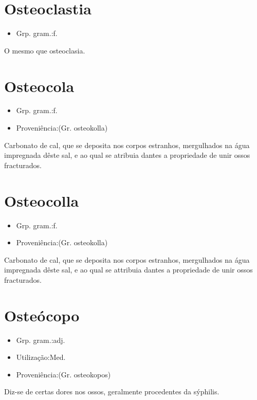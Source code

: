 \section{Osteoclastia}
\begin{itemize}
\item {Grp. gram.:f.}
\end{itemize}
O mesmo que \textunderscore osteoclasia\textunderscore .
\section{Osteocola}
\begin{itemize}
\item {Grp. gram.:f.}
\end{itemize}
\begin{itemize}
\item {Proveniência:(Gr. \textunderscore osteokolla\textunderscore )}
\end{itemize}
Carbonato de cal, que se deposita nos corpos estranhos, mergulhados na água impregnada dêste sal, e ao qual se atribuia dantes a propriedade de unir ossos fracturados.
\section{Osteocolla}
\begin{itemize}
\item {Grp. gram.:f.}
\end{itemize}
\begin{itemize}
\item {Proveniência:(Gr. \textunderscore osteokolla\textunderscore )}
\end{itemize}
Carbonato de cal, que se deposita nos corpos estranhos, mergulhados na água impregnada dêste sal, e ao qual se attribuia dantes a propriedade de unir ossos fracturados.
\section{Osteócopo}
\begin{itemize}
\item {Grp. gram.:adj.}
\end{itemize}
\begin{itemize}
\item {Utilização:Med.}
\end{itemize}
\begin{itemize}
\item {Proveniência:(Gr. \textunderscore osteokopos\textunderscore )}
\end{itemize}
Diz-se de certas dores nos ossos, geralmente procedentes da sýphilis.

